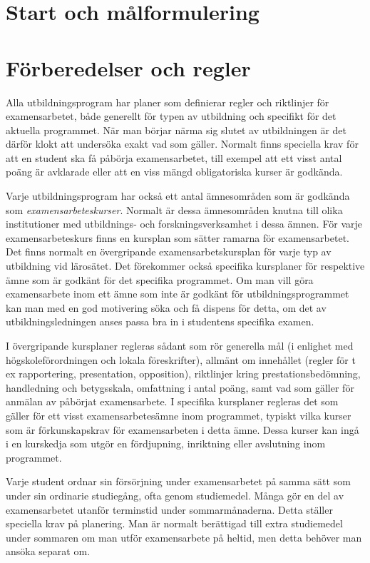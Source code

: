\section{Start och målformulering}\label{start-och-muxe5lformulering}

\section{Förberedelser och regler}\label{fuxf6rberedelser-och-regler}

Alla utbildningsprogram har planer som definierar regler och riktlinjer
för examensarbetet, både generellt för typen av utbildning och specifikt
för det aktuella programmet. När man börjar närma sig slutet av
utbildningen är det därför klokt att undersöka exakt vad som gäller.
Normalt finns speciella krav för att en student ska få påbörja
examensarbetet, till exempel att ett visst antal poäng är avklarade
eller att en viss mängd obligatoriska kurser är godkända.

Varje utbildningsprogram har också ett antal ämnesområden som är
godkända som \emph{examensarbeteskurser}. Normalt är dessa ämnesområden
knutna till olika institutioner med utbildnings- och
forskningsverksamhet i dessa ämnen. För varje examensarbeteskurs finns
en kursplan som sätter ramarna för examensarbetet. Det finns normalt en
övergripande examensarbetskursplan för varje typ av utbildning vid
lärosätet. Det förekommer också specifika kursplaner för respektive ämne
som är godkänt för det specifika programmet. Om man vill göra
examensarbete inom ett ämne som inte är godkänt för
utbildningsprogrammet kan man med en god motivering söka och få dispens
för detta, om det av utbildningsledningen anses passa bra in i
studentens specifika examen.

I övergripande kursplaner regleras sådant som rör generella mål (i
enlighet med högskoleförordningen och lokala föreskrifter), allmänt om
innehållet (regler för t ex rapportering, presentation, opposition),
riktlinjer kring prestationsbedömning, handledning och betygsskala,
omfattning i antal poäng, samt vad som gäller för anmälan av påbörjat
examensarbete. I specifika kursplaner regleras det som gäller för ett
visst examensarbetesämne inom programmet, typiskt vilka kurser som är
förkunskapskrav för examensarbeten i detta ämne. Dessa kurser kan ingå i
en kurskedja som utgör en fördjupning, inriktning eller avslutning inom
programmet.

Varje student ordnar sin försörjning under examensarbetet på samma sätt
som under sin ordinarie studiegång, ofta genom studiemedel. Många gör en
del av examensarbetet utanför terminstid under sommarmånaderna. Detta
ställer speciella krav på planering. Man är normalt berättigad till
extra studiemedel under sommaren om man utför examensarbete på heltid,
men detta behöver man ansöka separat om.

